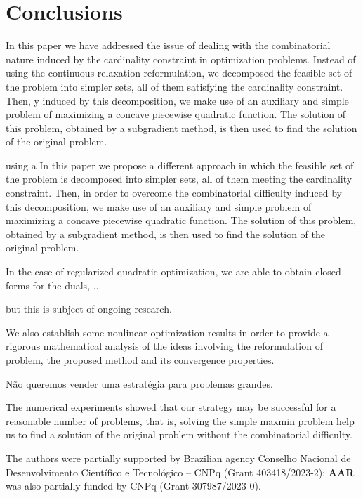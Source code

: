 \documentclass[smallextended,referee,envcountsect]{svjour3}
\newcommand{\Ademir}[1]{{\color{Ademir} #1}} %
\newcommand{\rmv}[1]{{\color{red} #1}} %
\begin{document}
\section{Conclusions}
\label{sec:conclusions} 
\Ademir{In this paper we have addressed the issue of dealing with the combinatorial 
nature induced by the cardinality constraint in optimization problems. Instead of using 
the continuous relaxation reformulation, we decomposed the feasible set of the problem 
into simpler sets, all of them satisfying the cardinality constraint. Then, y induced 
by this decomposition, we make use of an auxiliary and simple problem of maximizing a 
concave piecewise quadratic function. The solution of this problem, obtained by a 
subgradient method, is then used to find the solution of the original problem.

\rmv{
using a 
In this paper we propose a different approach in which the 
feasible set of the problem is decomposed into simpler sets, all of them meeting the 
cardinality constraint. Then, in order to overcome the combinatorial difficulty induced 
by this decomposition, we make use of an auxiliary and simple problem of maximizing a 
concave piecewise quadratic function. The solution of this problem, obtained by a 
subgradient method, is then used to find the solution of the original problem. 

In the case 
of regularized quadratic optimization, we are able to obtain closed forms for the 
duals, ... 

but this is subject of ongoing research.

We also establish some nonlinear optimization results in 
order to provide a rigorous mathematical analysis of the ideas involving the 
reformulation of problem, the proposed method and its convergence properties.

Não queremos vender uma estratégia para problemas grandes.}

The numerical experiments showed that our strategy may be successful for a reasonable 
number of problems, that is, solving the simple maxmin problem help us to find a solution 
of the original problem without the combinatorial difficulty.
}


\begin{acknowledgements}
The authors were partially supported by Brazilian agency Conselho Nacional de Desenvolvimento 
Científico e Tecnológico -- CNPq (Grant 403418/2023-2); \textbf{AAR} was also partially funded 
by CNPq (Grant 307987/2023-0). 
\end{acknowledgements}
\end{document}
